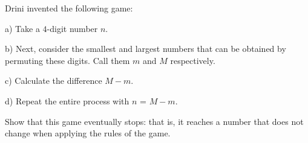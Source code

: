 Drini invented the following game:

a) Take a $4$-digit number $n$.

b) Next, consider the smallest and largest numbers that can be obtained by permuting these digits. Call them $m$ and $M$ respectively.

c) Calculate the difference $M - m$.

d) Repeat the entire process with $n$ = $M - m$.

Show that this game eventually stops: that is, it reaches a number that does not change when applying the rules of the game.
